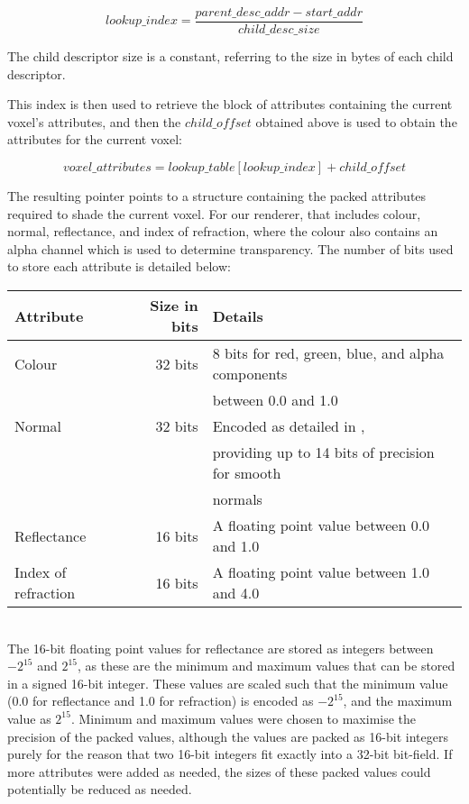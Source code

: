 \[
	lookup\_index = \frac{parent\_desc\_addr - start\_addr}{child\_desc\_size}
\]

The child descriptor size is a constant, referring to the size in bytes of each child descriptor.

This index is then used to retrieve the block of attributes containing the current voxel's attributes, and then the $child\_offset$ obtained above is used to obtain the attributes for the current voxel:

\[
	voxel\_attributes = lookup\_table[lookup\_index] + child\_offset
\]

The resulting pointer points to a structure containing the packed attributes required to shade the current voxel. For our renderer, that includes colour, normal, reflectance, and index of refraction, where the colour also contains an alpha channel which is used to determine transparency. The number of bits used to store each attribute is detailed below:\\

\begin{tabular}{|l|r|l|}
\hline

Attribute & Size in bits & Details \\
\hline

Colour	& 32 bits	& 8 bits for red, green, blue, and alpha components \\
		& 			& between 0.0 and 1.0 \\
\hline

Normal	& 32 bits	& Encoded as detailed in \cite{laine10efficientsvos}, \\
		&			& providing up to 14 bits of precision for smooth \\
		&			& normals \\
\hline

Reflectance & 16 bits & A floating point value between 0.0 and 1.0 \\
\hline

Index of refraction & 16 bits & A floating point value between 1.0 and 4.0 \\
\hline

\end{tabular} \\

The 16-bit floating point values for reflectance are stored as integers between $-2^{15}$ and $2^{15}$, as these are the minimum and maximum values that can be stored in a signed 16-bit integer. These values are scaled such that the minimum value (0.0 for reflectance and 1.0 for refraction) is encoded as $-2^{15}$, and the maximum value as $2^{15}$. Minimum and maximum values were chosen to maximise the precision of the packed values, although the values are packed as 16-bit integers purely for the reason that two 16-bit integers fit exactly into a 32-bit bit-field. If more attributes were added as needed, the sizes of these packed values could potentially be reduced as needed.

